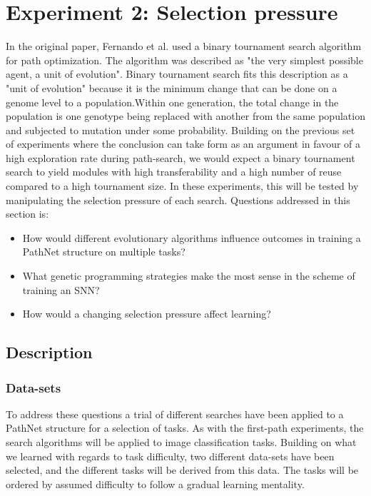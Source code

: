 \chapter{Experiment 2: Selection pressure}
\label{exp2}
In the original paper, Fernando et al.\cite{pathnet} used a binary tournament search algorithm for path optimization. The algorithm was described as "the very simplest possible agent, a unit of evolution". Binary tournament search fits this description as a "unit of evolution" because it is the minimum change that can be done on a genome level to a population.Within one generation, the total change in the population is one genotype being replaced with another from the same population and subjected to mutation under some probability. Building on the previous set of experiments where the conclusion can take form as an argument in favour of a high exploration rate during path-search, we would expect a binary tournament search to yield modules with high transferability and a high number of reuse compared to a high tournament size. In these experiments, this will be tested by manipulating the selection pressure of each search. Questions addressed in this section is: 
\begin{itemize}
    \item How would different evolutionary algorithms influence outcomes in training a PathNet structure on multiple tasks?
    \item What genetic programming strategies make the most sense in the scheme of training an SNN?
    \item How would a changing selection pressure affect learning? 
\end{itemize}
\newpage

\section{Description}
\subsection{Data-sets} 
\label{exp2:datasets}
To address these questions a trial of different searches have been applied to a PathNet structure for a selection of tasks. As with the first-path experiments, the search algorithms will be applied to image classification tasks. Building on what we learned with regards to task difficulty, two different data-sets have been selected, and the different tasks will be derived from this data. The tasks will be ordered by assumed difficulty to follow a gradual learning mentality. 

